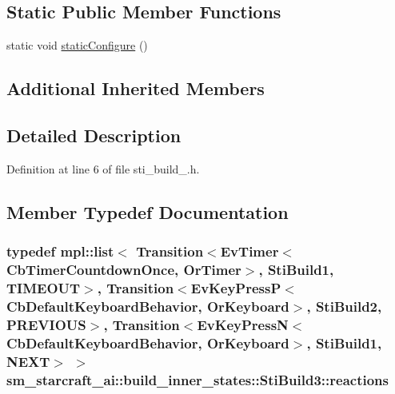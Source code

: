 \subsection*{Static Public Member Functions}
\begin{DoxyCompactItemize}
\item 
static void \hyperlink{structsm__starcraft__ai_1_1build__inner__states_1_1StiBuild3_a20b4866fcfb1434d4cf862a5f511bbf8}{static\+Configure} ()
\end{DoxyCompactItemize}
\subsection*{Additional Inherited Members}


\subsection{Detailed Description}


Definition at line 6 of file sti\+\_\+build\+\_.\+h.



\subsection{Member Typedef Documentation}
\subsubsection[{\texorpdfstring{reactions}{reactions}}]{\setlength{\rightskip}{0pt plus 5cm}typedef mpl\+::list$<$ Transition$<$Ev\+Timer$<$Cb\+Timer\+Countdown\+Once, {\bf Or\+Timer}$>$, {\bf Sti\+Build1}, {\bf T\+I\+M\+E\+O\+UT}$>$, Transition$<$Ev\+Key\+PressP$<$Cb\+Default\+Keyboard\+Behavior, {\bf Or\+Keyboard}$>$, {\bf Sti\+Build2}, {\bf P\+R\+E\+V\+I\+O\+US}$>$, Transition$<$Ev\+Key\+PressN$<$Cb\+Default\+Keyboard\+Behavior, {\bf Or\+Keyboard}$>$, {\bf Sti\+Build1}, {\bf N\+E\+XT}$>$ $>$ {\bf sm\+\_\+starcraft\+\_\+ai\+::build\+\_\+inner\+\_\+states\+::\+Sti\+Build3\+::reactions}}\hypertarget{structsm__starcraft__ai_1_1build__inner__states_1_1StiBuild3_a2b857ab01ffed639b605c5931f610676}{}\label{structsm__starcraft__ai_1_1build__inner__states_1_1StiBuild3_a2b857ab01ffed639b605c5931f610676}


